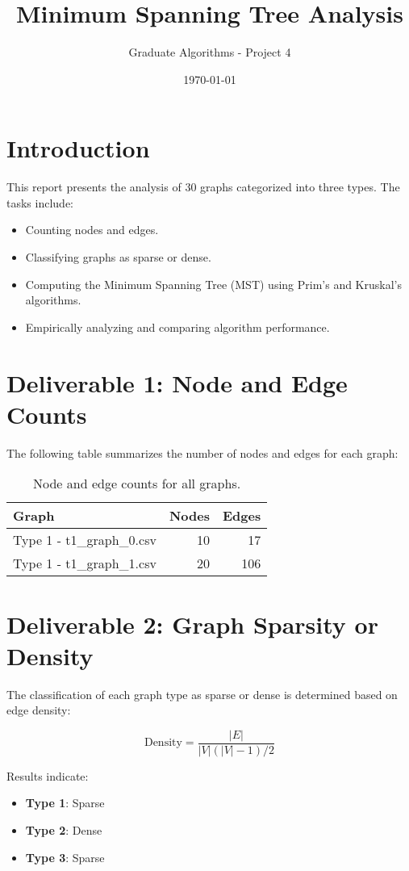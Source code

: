 \documentclass{article}
\title{Minimum Spanning Tree Analysis}
\author{Graduate Algorithms - Project 4}
\date{\today}
\begin{document}
\maketitle

\section*{Introduction}
This report presents the analysis of 30 graphs categorized into three types. The tasks include:
\begin{itemize}
    \item Counting nodes and edges.
    \item Classifying graphs as sparse or dense.
    \item Computing the Minimum Spanning Tree (MST) using Prim's and Kruskal's algorithms.
    \item Empirically analyzing and comparing algorithm performance.
\end{itemize}

\section*{Deliverable 1: Node and Edge Counts}
The following table summarizes the number of nodes and edges for each graph:

\begin{table}[h!]
\centering
\begin{tabular}{lrr}
\toprule
\textbf{Graph} & \textbf{Nodes} & \textbf{Edges} \\
\midrule
Type 1 - t1\_graph\_0.csv & 10 & 17 \\
Type 1 - t1\_graph\_1.csv & 20 & 106 \\
\bottomrule
\end{tabular}
\caption{Node and edge counts for all graphs.}
\label{tab:node_edge_counts}
\end{table}

\section*{Deliverable 2: Graph Sparsity or Density}
The classification of each graph type as sparse or dense is determined based on edge density:

\[
\text{Density} = \frac{|E|}{|V|(|V| - 1) / 2}
\]

Results indicate:
\begin{itemize}
    \item \textbf{Type 1}: Sparse
    \item \textbf{Type 2}: Dense
    \item \textbf{Type 3}: Sparse
\end{itemize}
\end{document}
